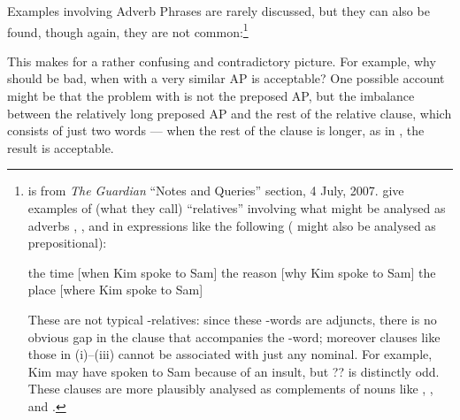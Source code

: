 \documentclass[output=paper
 	        ,biblatex
                ,babelshorthands
                ,newtxmath
                ,draftmode
                ,colorlinks, citecolor=brown
]{langscibook}
\begin{document}
Examples involving Adverb Phrases are rarely discussed, but they can also be found, though
again, they are not common:\footnote{ is from \emph{The Guardian} ``Notes
  and Queries'' section, 4 July, 2007. \cite[1053]{Huddleston02} give examples of (what
  they call) ``relatives'' involving what might be analysed as adverbs ,
  , and  in expressions like the following ( might also be
  analysed as prepositional):
  \begin{exe}
    \ex the time [when Kim spoke to Sam]\label{x:rc-2351}
    \ex the reason [why Kim spoke to Sam]\label{x:rc-2352}
    \ex the place [where Kim spoke to Sam]\label{x:rc-2353}
  \end{exe}
  These are not typical -relatives: since these -words are adjuncts, there
  is no obvious gap in the clause that accompanies the -word; moreover clauses
  like those in (i)--(iii) cannot be associated with just any nominal. For example, Kim
  may have spoken to Sam because of an insult, but ??
  is distinctly odd. These clauses are more plausibly analysed as complements of nouns
  like , , and .}
\begin{exe}
    \label{x:rc-2361} 
\end{exe}
This makes for a rather confusing and contradictory picture. For example, why should
 be bad, when  with a very similar AP is acceptable? One
possible account might be that the problem with  is not the preposed
AP, but the imbalance between the relatively long preposed AP and the rest of the relative
clause, which consists of just two words --- when the rest of the clause is longer, as in
, the result is acceptable.
\end{document}
